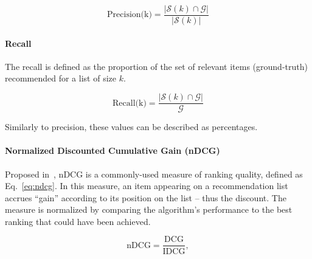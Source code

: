             \begin{equation}
            \text{Precision(k)}=\frac{|\mathcal{S}(k) \displaystyle \cap \mathcal{G}|}{|\mathcal{S}(k)|}
            \label{eq:precision}
            \end{equation}
            \vspace{0.25cm}
        
        
        \vspace{0.25cm}
        \noindent \paragraph{Recall}
        \vspace{0.25cm}
        
            The recall is defined as the proportion of the set of relevant items (ground-truth) recommended for a list of size $k$.
            
            \begin{equation}
            \text{Recall(k)}=\frac{|\mathcal{S}(k) \displaystyle \cap \mathcal{G}|}{\mathcal{G}}
            \label{eq:recall}
            \end{equation}
            \vspace{0.25cm}
            
            Similarly to precision, these values can be described as percentages.
            
        \vspace{0.25cm}
        \noindent \paragraph{Normalized Discounted Cumulative Gain (nDCG)}
        \vspace{0.25cm}
        
            Proposed in~\cite{jarvelin2002cumulated}, nDCG is a commonly-used measure of ranking quality, defined as Eq.~\eqref{eq:ndcg}. In this measure, an item appearing on a recommendation list accrues ``gain'' according to its position on the list -- thus the discount. The measure is normalized by comparing the algorithm's performance to the best ranking that could have been achieved. 
    
            \begin{equation}
            \text{nDCG}=\frac{\text{DCG}}{\text{IDCG}},
            \label{eq:ndcg}
            \end{equation}
            \vspace{0.25cm}
            
